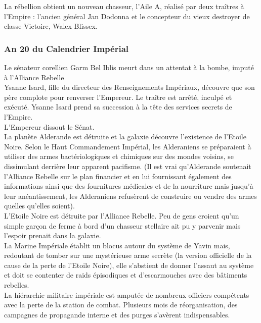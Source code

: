 \documentclass[twoside]{article}
\begin{document}
La rébellion obtient un nouveau chasseur, l’Aile A, réalisé par deux tra\^{i}tres à l'Empire : l'ancien général Jan Dodonna et le concepteur du vieux destroyer de classe Victoire, Walex Blissex.

\subsubsection*{An 20 du Calendrier Impérial}
Le sénateur corellien Garm Bel Iblis meurt dans un attentat à la bombe, imputé à l'Alliance Rebelle\\

Ysanne Isard, fille du directeur des Renseignements Impériaux, découvre que son père complote pour renverser l'Empereur. Le tra\^{i}tre est arrêté, inculpé et exécuté. Ysanne Isard prend sa succession à la tête des services secrets de l'Empire.\\

L'Empereur dissout le Sénat. \\

La planète Alderande est détruite et la galaxie découvre l'existence de l'Etoile Noire. Selon le Haut Commandement Impérial, les Alderaniens se préparaient à utiliser des armes bactériologiques et chimiques sur des mondes voisins, se dissimulant derrière leur apparent pacifisme. (Il est vrai qu'Alderande soutenait l'Alliance Rebelle sur le plan financier et en lui fournissant également des informations ainsi que des fournitures médicales et de la nourriture mais jusqu'à leur anéantissement, les Alderaniens refusèrent de construire ou vendre des armes quelles qu'elles soient). \\

L'Etoile Noire est détruite par l'Alliance Rebelle. Peu de gens croient qu'un simple garçon de ferme à bord d'un chasseur stellaire ait pu y parvenir mais l'espoir prenait dans la galaxie. \\

La Marine Impériale établit un blocus autour du système de Yavin mais, redoutant de tomber sur une mystérieuse arme secrète (la version officielle de la cause de la perte de l'Etoile Noire), elle s'abstient de donner l'assaut au système et doit se contenter de raids épisodiques et d'escarmouches avec des bâtiments rebelles. \\

La hiérarchie militaire impériale est amputée de nombreux officiers compétents avec la perte de la station de combat. Plusieurs mois de réorganisation, des campagnes de propagande interne et des purges s'avèrent indispensables. \\
\end{document}
